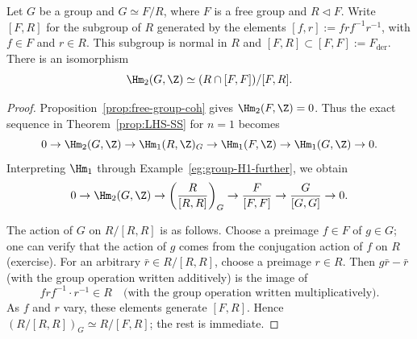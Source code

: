 \begin{corollary}[H.\ Hopf]\label{prop:Hopf-H2}
	Let $G$ be a group and $G\simeq F/R$, where $F$ is a free group and
	$R\lhd F$. Write $[F,R]$ for the subgroup of $R$ generated by the
	elements $[f,r]:=frf^{-1}r^{-1}$, with $f\in F$ and $r\in R$. This
	subgroup is normal in $R$ and
	$[F,R]\subset[F,F]:=F_{\mathrm{der}}$. There is an isomorphism
	\[ \Hm_2(G,\Z)\simeq(R\cap[F,F])/[F,R]. \]
\end{corollary}
\begin{proof}
	Proposition~\ref{prop:free-group-coh} gives $\Hm_2(F,\Z)=0$. Thus the
	exact sequence in Theorem~\ref{prop:LHS-SS} for $n=1$ becomes
	\[ 0\to\Hm_2(G,\Z)\to\Hm_1(R,\Z)_G
	\to\Hm_1(F,\Z)\to\Hm_1(G,\Z)\to0. \]
	Interpreting $\Hm_1$ through Example~\ref{eg:group-H1-further}, we obtain
	\[ 0\to\Hm_2(G,\Z)\to\left(\frac{R}{[R,R]}\right)_G
	\to\frac{F}{[F,F]}\to\frac{G}{[G,G]}\to0. \]

	The action of $G$ on $R/[R,R]$ is as follows. Choose a preimage $f\in F$
	of $g\in G$; one can verify that the action of $g$ comes from the
	conjugation action of $f$ on $R$ (exercise). For an arbitrary
	$\bar r\in R/[R,R]$, choose a preimage $r\in R$. Then
	$g\bar r-\bar r$ (with the group operation written additively) is the
	image of
	\[ frf^{-1}\cdot r^{-1}\in R
	\quad\text{(with the group operation written multiplicatively)}. \]
	As $f$ and $r$ vary, these elements generate $[F,R]$. Hence
	$(R/[R,R])_G\simeq R/[F,R]$; the rest is immediate.
\end{proof}

